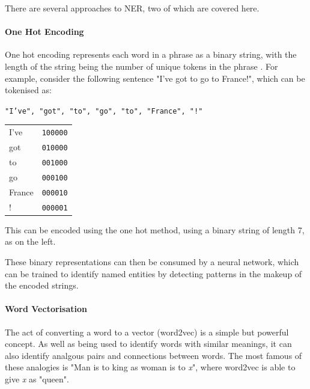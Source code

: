 There are several approaches to NER, two of which are covered here.

\paragraph{One Hot Encoding}
One hot encoding represents each word in a phrase as a binary string, with the length of the string being the number of unique tokens in the phrase \cite{bommana2019}.  For example, consider the following sentence "I've got to go to France!", which can be tokenised as:
\begin{center}\texttt{"I've", "got", "to", "go", "to", "France", "!"}
\end{center}

\begin{minipage}{0.25\textwidth}
\begin{tabular}{ll}
I've   & \texttt{100000} \\
got	   & \texttt{010000} \\
to	   & \texttt{001000} \\  
go 	   & \texttt{000100} \\  
France & \texttt{000010} \\  
!	   & \texttt{000001} \\  
\end{tabular}
\end{minipage}
\begin{minipage}{0.68\textwidth}
This can be encoded using the one hot method, using a binary string of length 7, as on the left.

These binary representations can then be consumed by a neural network, which can be trained to identify named entities by detecting patterns in the makeup of the encoded strings.

\end{minipage}

\paragraph{Word Vectorisation}\label{lit:word2vec}

The act of converting a word to a vector (word2vec) is a simple but powerful concept. As well as being used to identify words with similar meanings, it can also identify analgous pairs and connections between words. The most famous of these analogies is "Man is to king as woman is to \textit{x}", where word2vec is able to give \textit{x} as "queen". \cite{church2017}


